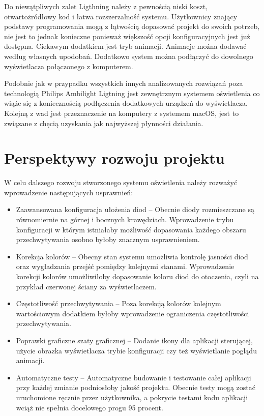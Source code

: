 \documentclass[12pt]{report}
\begin{document}
Do niewątpliwych zalet Ligthning należy z pewnością niski koszt, otwartożródłowy kod i łatwa rozszerzalność systemu. Użytkownicy znający podstawy programowania mogą z łątwością dopasować projekt do swoich potrzeb, nie jest to jednak konieczne ponieważ większość opcji konfiguracyjnych jest już dostępna. Ciekawym dodatkiem jest tryb animacji. Animacje można dodawać według własnych upodobań. Dodatkowo system można podłączyć do dowolnego wyświetlacza połączonego z komputerem.

Podobnie jak w przypadku wszystkich innych analizowanych rozwiązań poza technologią Philips Ambilight Ligtning jest zewnętrznym systemem oświetlenia co wiąże się z koniecznością podłączenia dodatkowych urządzeń do wyświetlacza. Kolejną z wad jest przeznaczenie na komputery z systemem macOS, jest to związane z chęcią uzyskania jak najwyższej płynności działania.

\section{Perspektywy rozwoju projektu} \label{prp}

W celu dalszego rozwoju stworzonego systemu oświetlenia należy rozważyć wprowadzenie następujących usprawnień:

\begin{itemize}
	\item Zaawansowana konfiguracja ułożenia diod -- Obecnie diody rozmieszczane są równomiernie na górnej i bocznych krawędziach. Wprowadzenie trybu konfiguracji w którym istniałaby możliwość dopasowania każdego obszaru przechwytywania osobno byłoby znacznym usprawnieniem.
	\item Korekcja kolorów -- Obecny stan systemu umożliwia kontrolę jasności diod oraz wygładzania przejść pomiędzy kolejnymi stanami. Wprowadzenie korekcji kolorów umożliwiłoby dopasowanie koloru diod do otoczenia, czyli na przykład czerwonej ściany za wyświetlaczem.
	\item Częstotliwość przechwytywania -- Poza korekcją kolorów kolejnym wartościowym dodatkiem byłoby wprowadzenie ograniczenia częstotliwości przechwytywania.
	\item Poprawki graficzne szaty graficznej -- Dodanie ikony dla aplikacji sterującej, użycie obrazka wyświetlacza trybie konfiguracji czy też wyświetlanie poglądu animacji.
	\item Automatyczne testy -- Automatyczne budowanie i testowanie całej aplikacji przy każdej zmianie podniosłoby jakość projektu.  Obecnie testy mogą zostać uruchomione ręcznie przez użytkownika, a pokrycie testami kodu aplikacji wciąż nie spełnia docelowego progu 95 procent.
\end{itemize}
\end{document}
